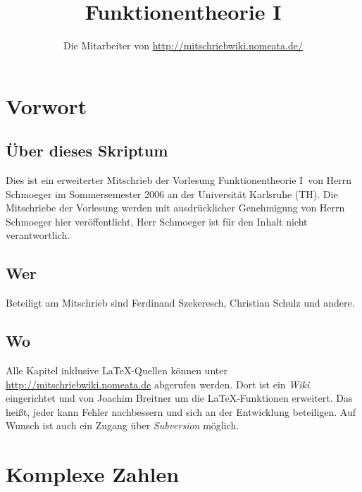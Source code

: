 \documentclass[a4paper,twoside,DIV15,BCOR12mm]{scrbook}
\author{Die Mitarbeiter von \url{http://mitschriebwiki.nomeata.de/}}
\title{Funktionentheorie I}
\begin{document}
\maketitle

\renewcommand{\thechapter}{\Roman{chapter}}
\tableofcontents

\chapter{Vorwort}

\section{Über dieses Skriptum}
Dies ist ein erweiterter Mitschrieb der Vorlesung \glqq Funktionentheorie I\grqq\ von Herrn Schmoeger im
Sommersemester 2006 an der Universität Karlsruhe (TH). Die Mitschriebe der Vorlesung werden mit
ausdrücklicher Genehmigung von Herrn Schmoeger hier veröffentlicht, Herr Schmoeger ist für den
Inhalt nicht verantwortlich.

\section{Wer}
Beteiligt am Mitschrieb sind Ferdinand Szekeresch, Christian Schulz  und andere.

\section{Wo}
Alle Kapitel inklusive \LaTeX-Quellen können unter \url{http://mitschriebwiki.nomeata.de} abgerufen werden.
Dort ist ein \emph{Wiki} eingerichtet und von Joachim Breitner um die \LaTeX-Funktionen erweitert.
Das heißt, jeder kann Fehler nachbessern und sich an der Entwicklung
beteiligen. Auf Wunsch ist auch ein Zugang über \emph{Subversion} möglich.



\renewcommand{\thechapter}{\arabic{chapter}}
\renewcommand{\chaptername}{§}
\setcounter{chapter}{0}

\chapter{Komplexe Zahlen}
\end{document}
